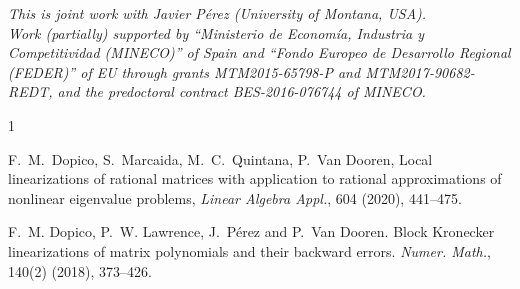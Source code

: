 \documentclass[a4paper]{amsart}
\makeatletter
\def\labelenumi{\theenumi.}
\def\theenumi{\@arabic\c@enumi}
\makeatother
\begin{document}
	
	\emph{This is joint work with Javier Pérez (University of Montana, USA).\\
		Work (partially) supported by ``Ministerio de Econom\'ia, Industria y Competitividad (MINECO)'' of Spain and ``Fondo Europeo de Desarrollo Regional (FEDER)'' of EU through grants MTM2015-65798-P and MTM2017-90682-REDT, and the predoctoral contract BES-2016-076744 of MINECO.}
	
	
	\makeatletter %
	\def\labelenumi{[\theenumi]}
	\def\theenumi{\@arabic\c@enumi}
	\makeatother
	
	
\begin{thebibliography}{1}

		 F.~M.~Dopico, S.~Marcaida, M.~C.~Quintana, P.~Van Dooren,
		\newblock Local linearizations of rational matrices with application to rational approximations of nonlinear eigenvalue problems, \textit{Linear Algebra Appl.}, 604 (2020), 441--475.
		
		 F.~M. Dopico, P.~W. Lawrence, J.~Pérez and P.~Van Dooren. Block Kronecker linearizations of matrix polynomials and their backward errors. \textit{Numer. Math.}, 140(2) (2018), 373--426.

\end{thebibliography}


	
	
\end{document}
